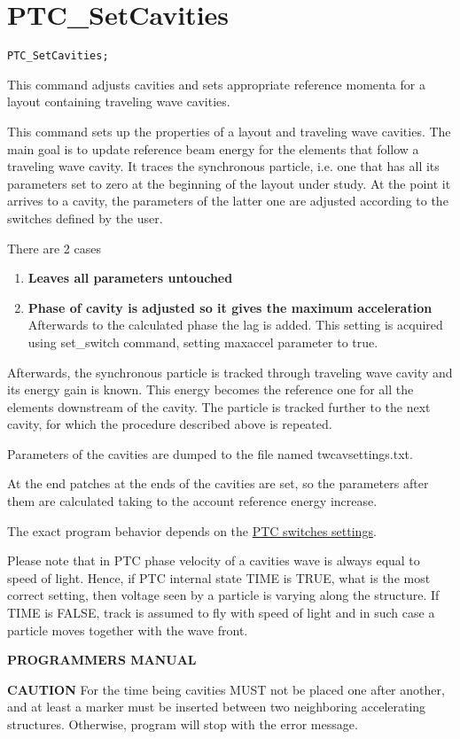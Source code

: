 
\section{PTC\_SetCavities}

\begin{verbatim}
PTC_SetCavities;
\end{verbatim}

This command adjusts cavities and sets appropriate reference momenta for
a layout containing traveling wave cavities.

This command sets up the properties of a layout and traveling wave
cavities.  The main goal is to update  reference beam energy for the
elements  that follow a traveling wave cavity.  It traces the
synchronous particle, i.e. one that has  all its parameters set to zero
at the beginning of the layout under study. At the point it arrives to a
cavity,  the parameters of the latter one are adjusted according to the
switches  defined by the user. 

There are 2 cases   
\begin{enumerate}
   \item \textbf{Leaves all parameters untouched}
   \item \textbf{Phase of cavity is adjusted so it gives the maximum
     acceleration} Afterwards to the calculated phase the lag
     is added. This setting is acquired using set\_switch
     command, setting maxaccel parameter to true.   
\end{enumerate} 

Afterwards,  the synchronous particle is tracked through traveling wave
cavity  and its energy gain is known.  This energy becomes the reference
one for all the elements downstream of the cavity.  The particle is
tracked further to the next cavity,  for which the procedure described
above is repeated.    

Parameters of the cavities are dumped to the file named
twcavsettings.txt.    

At the end patches at the ends of the cavities are set,  so the
parameters after them are  calculated taking to the account reference
energy increase.   

The exact program behavior depends on the  \href{PTC_SetSwitch.html}{
  PTC switches settings}.   

Please note that in PTC phase velocity of a cavities wave is always
equal to speed of light.  Hence, if PTC internal state TIME is TRUE,
what is the most correct setting,  then voltage seen by a particle is
varying along the structure. If TIME is FALSE,  track is assumed to fly
with speed of light and in such case a particle moves together with the
wave front.    


{\bf PROGRAMMERS MANUAL}

{\bf CAUTION} For the time being cavities MUST not be placed one after
another, and at least a marker must be inserted between two neighboring
accelerating structures. Otherwise, program will stop with the error
message.    
